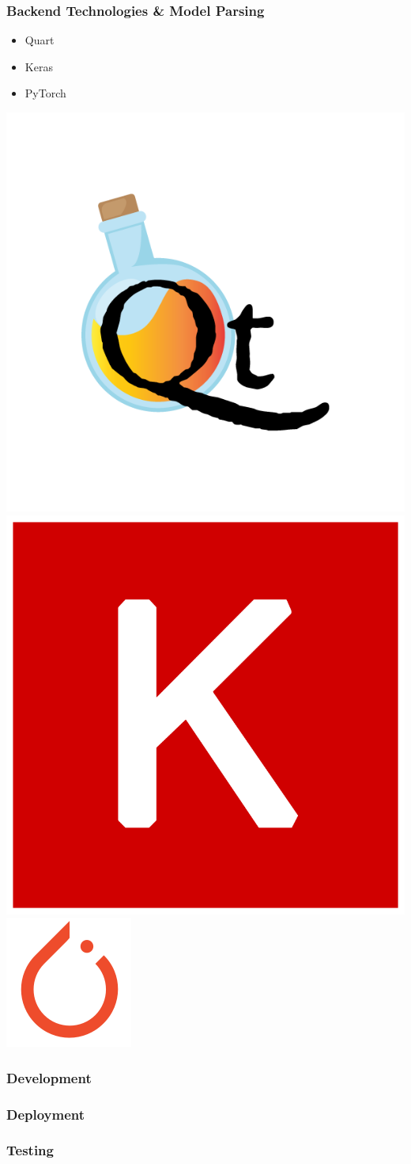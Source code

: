 \documentclass{beamer}
\begin{document}
\begin{frame}
    \frametitle{Backend Technologies \& Model Parsing}
    \begin{block}{}
        \begin{itemize}
            \item Quart
            \item Keras
            \item PyTorch
        \end{itemize}
    \end{block}
    \vspace{0.75cm}
    \centering
    \includegraphics[scale=.3, width=.2\textwidth]{res/quart_logo.png}\hfill %
    \includegraphics[scale=.05, width=.2\textwidth]{res/keras_logo.png}\hfill %
    \includegraphics[scale=.25, width=.2\textwidth]{res/pytorch_logo.png} %
\end{frame}

\begin{frame}
    \frametitle{Development}
\end{frame}

\begin{frame}
    \frametitle{Deployment}
\end{frame}

\begin{frame}
    \frametitle{Testing}
\end{frame}
\end{document}
